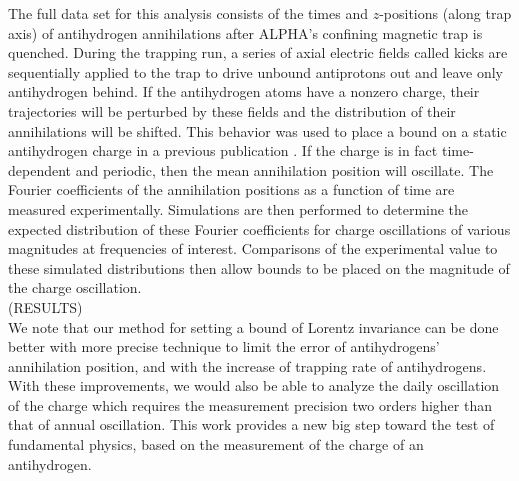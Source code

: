 \documentclass[superscriptaddress,aps,prb,11pt]{revtex4-1}
\begin{document}
The full data set for this analysis consists of the times and $z$-positions (along trap axis) of antihydrogen annihilations after ALPHA's confining magnetic trap is quenched.  During the trapping run, a series of axial electric fields called kicks are sequentially applied to the trap to drive unbound antiprotons out and leave only antihydrogen behind. If the antihydrogen atoms have a nonzero charge, their trajectories will be perturbed by these fields and the distribution of their annihilations will be shifted.  This behavior was used to place a bound on a static antihydrogen charge in a previous publication \citep{amol:14a}.  If the charge is in fact time-dependent and periodic, then the mean annihilation position will oscillate.  The Fourier coefficients of the annihilation positions as a function of time are measured experimentally.  Simulations are then performed to determine the expected distribution of these Fourier coefficients for charge oscillations of various magnitudes at frequencies of interest.  Comparisons of the experimental value to these simulated distributions then allow bounds to be placed on the magnitude of the charge oscillation.
\\

\noindent
(RESULTS)
\\

We note that our method for setting a bound of Lorentz invariance can be done better with more precise technique to limit the error of antihydrogens' annihilation position, and with the increase of trapping rate of antihydrogens. With these improvements, we would also be able to analyze the daily oscillation of the charge which requires the measurement precision two orders higher than that of annual oscillation. This work provides a new big step toward the test of fundamental physics, based on the measurement of the charge of an antihydrogen.
\end{document}

